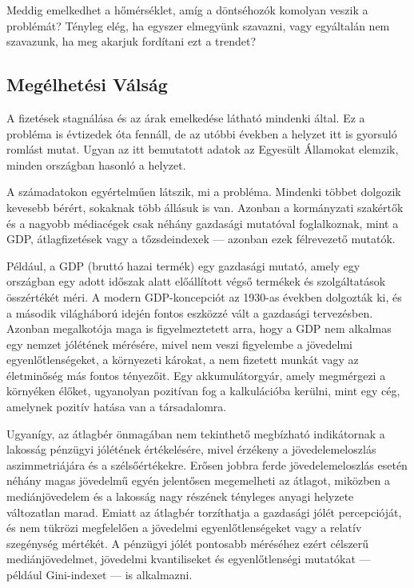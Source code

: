 Meddig emelkedhet a hőmérséklet, amíg a döntséhozók komolyan veszik a problémát? Tényleg
elég, ha egyszer elmegyünk szavazni, vagy egyáltalán nem szavazunk, ha meg akarjuk fordítani
ezt a trendet?



\subsection{Megélhetési Válság}

A fizetések stagnálása és az árak emelkedése látható mindenki által. Ez a probléma is
évtizedek óta fennáll, de az utóbbi években a helyzet itt is gyorsuló romlást mutat. Ugyan
az itt bemutatott adatok az Egyesült Államokat elemzik, minden országban hasonló a helyzet.

A számadatokon egyértelműen látszik, mi a probléma. Mindenki többet dolgozik kevesebb
bérért, sokaknak több állásuk is van. Azonban a kormányzati szakértők és a nagyobb
médiacégek csak néhány gazdasági mutatóval foglalkoznak, mint a GDP, átlagfizetések
vagy a tőzsdeindexek --- azonban ezek félrevezető mutatók.

Például, a GDP (bruttó hazai termék) egy gazdasági mutató, amely egy országban egy adott
időszak alatt előállított végső termékek és szolgáltatások összértékét méri. A
modern GDP-koncepciót az 1930-as években dolgozták ki, és a második világháború idején
fontos eszközzé vált a gazdasági tervezésben. Azonban megalkotója maga is figyelmeztetett
arra, hogy a GDP nem alkalmas egy nemzet jólétének mérésére, mivel nem veszi figyelembe
a jövedelmi egyenlőtlenségeket, a környezeti károkat, a nem fizetett munkát vagy az
életminőség más fontos tényezőit. Egy akkumulátorgyár, amely megmérgezi a környéken
élőket, ugyanolyan pozitívan fog a kalkulációba kerülni, mint egy cég, amelynek pozitív
hatása van a társadalomra.

Ugyanígy, az átlagbér önmagában nem tekinthető megbízható indikátornak a lakosság
pénzügyi jólétének értékelésére, mivel érzékeny a jövedelemeloszlás aszimmetriájára
és a szélsőértékekre. Erősen jobbra ferde jövedelemeloszlás esetén néhány magas
jövedelmű egyén jelentősen megemelheti az átlagot, miközben a mediánjövedelem és a
lakosság nagy részének tényleges anyagi helyzete változatlan marad. Emiatt az átlagbér
torzíthatja a gazdasági jólét percepcióját, és nem tükrözi megfelelően a jövedelmi
egyenlőtlenségeket vagy a relatív szegénység mértékét. A pénzügyi jólét pontosabb
méréséhez ezért célszerű mediánjövedelmet, jövedelmi kvantiliseket és egyenlőtlenségi
mutatókat --- például Gini-indexet --- is alkalmazni.

